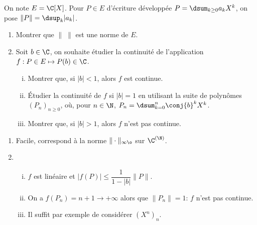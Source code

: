 \begin{enonce}
\begin{exercise}[ID={RMS134 E1462},subtitle={CCINP MP 2023},difficulty={},tags={analyse, ccinp, 2023}]
  On note $E=\C[X]$. Pour $P\in E$ d'écriture développée
  $P=\dsum_{k\ge 0}a_kX^k$, on pose $\|P\|=\dsup_{k}|a_k|$.
  \begin{enumerate}[\bfseries a)]
  \item Montrer que $\|\;\|$ est une norme de $E$.
  \item Soit $b\in\C$, on souhaite étudier la continuité de
    l'application $f:P\in E\mapsto P(b)\in\C$.
    \begin{enumerate}[(i)]
    \item Montrer que, si $|b|<1$, alors $f$ est continue.
    \item Étudier la continuité de $f$ si $|b|=1$ en utilisant la
      suite de polynômes $(P_n)_{n\ge 0}$, où, pour $n\in\N$,
      $P_n=\dsum_{k=0}^n\conj{b}^kX^k$.
    \item Montrer que, si $|b|>1$, alors $f$ n'est pas continue.
    \end{enumerate}
  \end{enumerate}
\end{exercise}
\begin{solution}
  \begin{enumerate}[\bfseries a)]
  \item Facile, correspond à la norme $\|\cdot\|_{\inftyø}$ sur $\C^{(\N)}$.
  \item
    \begin{enumerate}[(i)]
    \item $f$ est linéaire et $|f(P)|\le \dfrac1{1-|b|}\|P\|$.
    \item On a $f(P_n)=n+1\to +\infty$ alors que $\|P_n\|=1$: $f$
      n'est pas continue.
    \item Il suffit par exemple de considérer $(X^n)_n$. 
    \end{enumerate}
  \end{enumerate}
\end{solution}
\end{enonce}